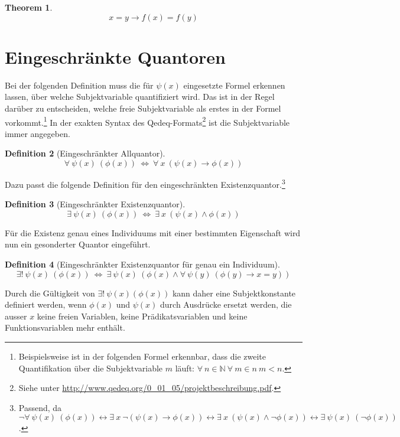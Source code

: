 \documentclass[a4paper,german,10pt,twoside]{book}
\newtheorem{thm}{Theorem}[chapter]
\theoremstyle{definition}
\newtheorem{defn}[thm]{Definition}
\theoremstyle{remark}
\begin{document}
\begin{thm}
\begin{equation}
x = y \rightarrow f(x) = f(y)
\end{equation}
\end{thm}

\section{Eingeschr{\"a}nkte Quantoren} \label{chapter6_section1} \hypertarget{chapter6_section1}{}
Bei der folgenden Definition muss die f{\"u}r $\psi(x)$ eingesetzte Formel {\glqq erkennen
lassen\grqq}, {\"u}ber welche Subjektvariable quantifiziert wird. Das ist in der Regel dar{\"u}ber zu
entscheiden, welche freie Subjektvariable als erstes in der Formel
vorkommt.\footnote{Beispielsweise ist in der folgenden Formel erkennbar, dass die zweite
Quantifikation {\"u}ber die Subjektvariable $m$ l{\"a}uft: $\forall \ n \in \mathbb{N} \ \forall \ m \in n \ m < n
$.} In der exakten Syntax des Qedeq-Formats\footnote{Siehe unter
\url{http://www.qedeq.org/0_01_05/projektbeschreibung.pdf}.} ist die Subjektvariable immer
angegeben.
\begin{defn}[Eingeschr{\"a}nkter Allquantor]
$$ \forall \ \psi(x) \ (\phi(x)) \ \Leftrightarrow \ \forall \ x \ (\psi(x) \rightarrow \phi(x))$$
\end{defn}

Dazu passt die folgende Definition f{\"u}r den eingeschr{\"a}nkten Existenzquantor.\footnote{Passend, da
$\neg \forall \ \psi(x) \ (\phi(x)) \leftrightarrow \exists \ x \ \neg (\psi(x) \rightarrow \phi(x)) \leftrightarrow \exists
\ x \ (\psi(x) \land \neg\phi(x)) \leftrightarrow \exists \ \psi(x) \ (\neg\phi(x))$.}
\begin{defn}[Eingeschr{\"a}nkter Existenzquantor]
$$ \exists \ \psi(x) \ (\phi(x)) \ \Leftrightarrow \ \exists \ x \ (\psi(x) \land \phi(x))$$
\end{defn}

F{\"u}r die Existenz genau eines Individuums mit einer bestimmten Eigenschaft wird nun ein gesonderter
Quantor eingef{\"u}hrt.
\begin{defn}[Eingeschr{\"a}nkter Existenzquantor f{\"u}r genau ein Individuum]
$$ \exists! \ \psi(x) \ (\phi(x)) \ \Leftrightarrow \ \exists \ \psi(x) \ (\phi(x) \land \forall \ \psi(y) \ (\phi(y) \rightarrow x = y))$$
\end{defn}
Durch die G{\"u}ltigkeit von $\exists! \ \psi(x) (\phi(x))$ kann daher eine Subjektkonstante definiert
werden, wenn $\phi(x)$ und $\psi(x)$ durch Ausdr{\"u}cke ersetzt werden, die ausser $x$ keine freien
Variablen, keine Pr{\"a}dikatsvariablen und keine Funktionsvariablen mehr enth{\"a}lt.
\end{document}
